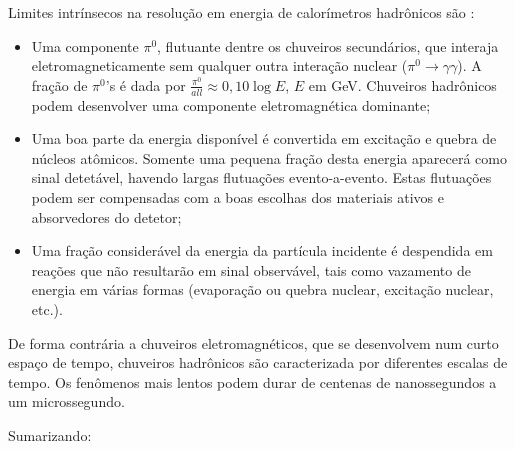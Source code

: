 Limites intrínsecos na resolução em energia de calorímetros hadrônicos são
\cite{hadcal}:

\begin{itemize}
  \item Uma componente $\pi^{0}$, flutuante dentre os chuveiros secundários, que
  interaja eletromagneticamente sem qualquer outra interação nuclear ($\pi^{0}
  \rightarrow \gamma\gamma$). A fração de $\pi^{0}$'s é dada por
  $\frac{\pi^{0}}{all} \approx 0,10 \log{E}$, $E$ em GeV. Chuveiros hadrônicos
  podem desenvolver uma componente eletromagnética dominante;

\item Uma boa parte da energia disponível é convertida em excitação e quebra
  de núcleos atômicos. Somente uma pequena fração desta energia aparecerá como
  sinal detetável, havendo largas flutuações evento-a-evento. Estas flutuações
  podem ser compensadas com a boas escolhas dos materiais ativos e absorvedores
  do detetor;

\item Uma fração considerável da energia da partícula incidente é despendida
  em reações que não resultarão em sinal observável, tais como vazamento de
  energia em várias formas (evaporação ou quebra nuclear, excitação nuclear,
  etc.).
\end{itemize}

De forma contrária a chuveiros eletromagnéticos, que se desenvolvem num curto
espaço de tempo, chuveiros hadrônicos são caracterizada por diferentes escalas
de tempo. Os fenômenos mais lentos podem durar de centenas de nanossegundos a
um microssegundo.

Sumarizando:

